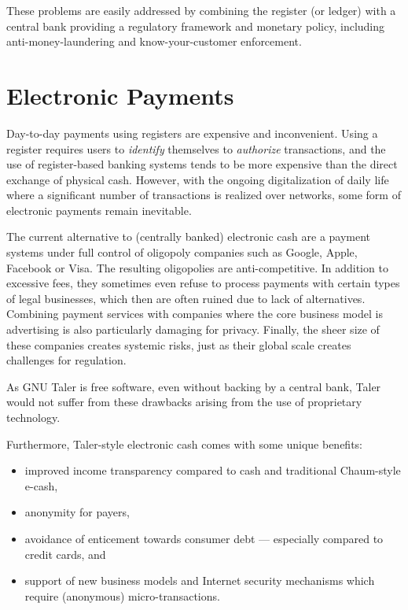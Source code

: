 These problems are easily addressed by combining the register (or
ledger) with a central bank providing a regulatory framework and
monetary policy, including anti-money-laundering and
know-your-customer enforcement.

\section{Electronic Payments}

Day-to-day payments using registers are expensive and inconvenient.
Using a register requires users to {\em identify} themselves to {\em
  authorize} transactions, and the use of register-based banking
systems tends to be more expensive than the direct exchange of
physical cash.  However, with the ongoing digitalization of daily life
where a significant number of transactions is realized over networks,
some form of electronic payments remain inevitable.

The current alternative to (centrally banked) electronic cash are a
payment systems under full control of oligopoly companies such as
Google, Apple, Facebook or Visa.  The resulting oligopolies are
anti-competitive. In addition to excessive fees, they sometimes even
refuse to process payments with certain types of legal businesses,
which then are often ruined due to lack of alternatives.  Combining
payment services with companies where the core business model is
advertising is also particularly damaging for privacy.  Finally, the
sheer size of these companies creates systemic risks, just as their
global scale creates challenges for regulation.

As GNU Taler is free software, even without backing by a central bank,
Taler would not suffer from these drawbacks arising from the use of
proprietary technology.

Furthermore, Taler-style electronic cash comes
with some unique benefits:
\begin{itemize}
  \item improved income transparency compared to cash and traditional
    Chaum-style e-cash,
  \item anonymity for payers,
  \item avoidance of enticement towards consumer debt --- especially
    compared to credit cards, and
  \item support of new business models and Internet security
    mechanisms which require (anonymous) micro-transactions.
\end{itemize}

